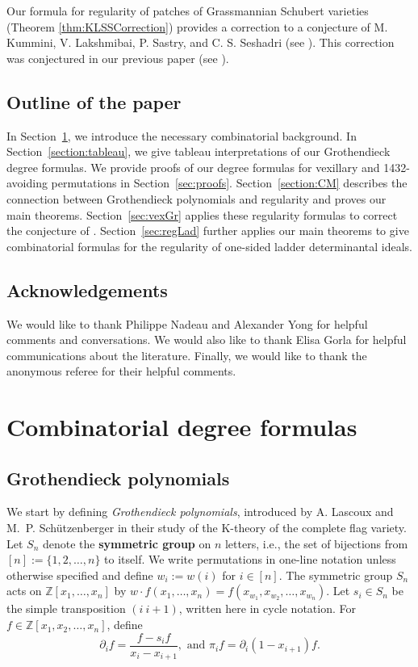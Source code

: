 \documentclass[12pt]{amsart}
\theoremstyle{definition}
\theoremstyle{remark}
\numberwithin{equation}{section}
\newcommand\mydef[1]{{\bf #1}}
\newcommand{\Sym}{S}
\begin{document}
Our formula for regularity of patches of Grassmannian Schubert varieties (Theorem \ref{thm:KLSSCorrection}) provides a correction to a conjecture of M. Kummini, V. Lakshmibai, P. Sastry, and C. S. Seshadri (see \cite[Conjecture 7.5]{KLSS}). This correction was conjectured in our previous paper (see \cite[Conjecture 5.6]{RRRSW}).

\subsection{Outline of the paper}
In Section~\ref{sec:background}, we introduce the necessary combinatorial background. In Section~\ref{section:tableau}, we give tableau interpretations of our Grothendieck degree formulas. 
We provide proofs of our degree formulas for vexillary and 1432-avoiding permutations in Section~\ref{sec:proofs}.
Section~\ref{section:CM} describes the connection between Grothendieck polynomials and regularity and proves our main theorems. 
Section~\ref{sec:vexGr} applies these regularity formulas to correct the conjecture of \cite{KLSS}. 
Section~\ref{sec:regLad} further applies our main theorems to give combinatorial formulas for the regularity of one-sided ladder determinantal ideals. 


\subsection*{Acknowledgements}
We would like to thank  Philippe Nadeau and Alexander Yong for helpful comments and conversations. We would also like to thank Elisa Gorla for helpful communications about the literature. Finally, we would like to thank the anonymous referee for their helpful comments.








\section{Combinatorial degree formulas}
\label{sec:background}


\subsection{Grothendieck polynomials}
\label{subsec:grothbackground}
 
	We start by defining \emph{Grothendieck polynomials}, introduced by A. Lascoux and M.~P. Sch\"utzenberger \cite{LS82} in their study of the K-theory of the complete flag variety.
	Let $\Sym_n$ denote the \mydef{symmetric group} on $n$ letters, i.e., the set of bijections from $[n]:=\{1,2,\ldots, n\}$ to itself.  We write permutations in one-line notation unless otherwise specified and define $w_i:=w(i)$ for $i\in[n]$. 
	The symmetric group $S_n$ acts on $\mathbb Z[x_1,\dots,x_n]$ by $w\cdot f(x_1,\ldots,x_n)=f(x_{w_1},x_{w_2},\dots,x_{w_n})$.
	Let $s_i\in S_n$ be the simple transposition $(i \ i+1)$,  written here in cycle notation.  
	For $f\in\mathbb{Z}[x_1,x_2,\ldots,x_n]$, define
 \[\partial_if=\frac{f-s_if}{x_i-x_{i+1}}, \text{ and } \pi_if=\partial_i(1-x_{i+1})f.\]
  
\end{document}
